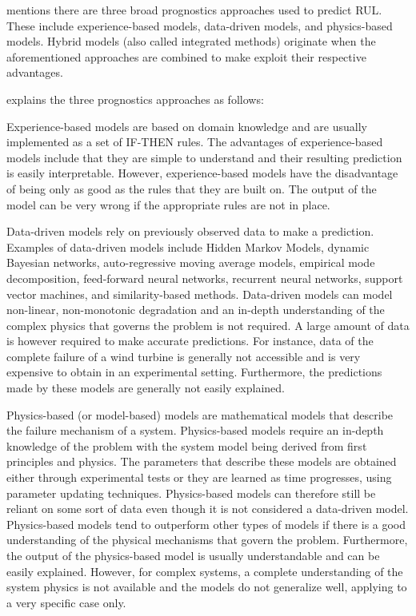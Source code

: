
\cite{Liao2014} mentions there are three broad prognostics approaches used to predict RUL. These include experience-based models, data-driven models, and physics-based models. Hybrid models (also called integrated methods) originate when the aforementioned approaches are combined to make exploit their respective advantages.

\cite{Liao2014} explains the three prognostics approaches as follows:

Experience-based models are based on domain knowledge and are usually implemented as a set of IF-THEN rules. The advantages of experience-based models include that they are simple to understand and their resulting prediction is easily interpretable. However, experience-based models have the disadvantage of being only as good as the rules that they are built on. The output of the model can be very wrong if the appropriate rules are not in place. 

Data-driven models rely on previously observed data to make a prediction. Examples of data-driven models include Hidden Markov Models, dynamic Bayesian networks, auto-regressive moving average models, empirical mode decomposition, feed-forward neural networks, recurrent neural networks, support vector machines, and similarity-based methods. Data-driven models can model non-linear, non-monotonic degradation and an in-depth understanding of the complex physics that governs the problem is not required. A large amount of data is however required to make accurate predictions. For instance, data of the complete failure of a wind turbine is generally not accessible and is very expensive to obtain in an experimental setting. Furthermore, the predictions made by these models are generally not easily explained.  

Physics-based (or model-based) models are mathematical models that describe the failure mechanism of a system. Physics-based models require an in-depth knowledge of the problem with the system model being derived from first principles and physics. The parameters that describe these models are obtained either through experimental tests or they are learned as time progresses, using parameter updating techniques. Physics-based models can therefore still be reliant on some sort of data even though it is not considered a data-driven model. Physics-based models tend to outperform other types of models if there is a good understanding of the physical mechanisms that govern the problem. Furthermore, the output of the physics-based model is usually understandable and can be easily explained. However, for complex systems, a complete understanding of the system physics is not available and the models do not generalize well, applying to a very specific case only. 


